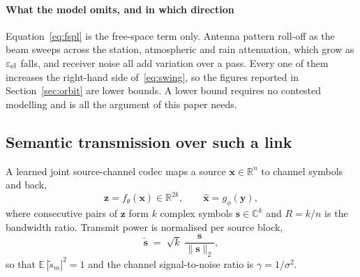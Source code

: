 \documentclass[preprint,11pt,3p]{elsarticle}
\begin{document}
\paragraph{What the model omits, and in which direction}
Equation~\eqref{eq:fspl} is the free-space term only. Antenna pattern roll-off as the beam sweeps
across the station, atmospheric and rain attenuation, which grow as $\varepsilon_{\rm el}$ falls,
and receiver noise all add variation over a pass. Every one of them increases the right-hand side
of~\eqref{eq:swing}, so the figures reported in Section~\ref{sec:orbit} are lower bounds. A lower
bound requires no contested modelling and is all the argument of this paper needs.

\subsection{Semantic transmission over such a link}

A learned joint source-channel codec maps a source $\mathbf{x} \in \mathbb{R}^{n}$ to channel
symbols and back,
\begin{equation}
  \mathbf{z} = f_{\theta}(\mathbf{x}) \in \mathbb{R}^{2k},
  \qquad
  \hat{\mathbf{x}} = g_{\phi}(\mathbf{y}) ,
  \label{eq:codec}
\end{equation}
where consecutive pairs of $\mathbf{z}$ form $k$ complex symbols $\mathbf{s} \in \mathbb{C}^{k}$
and $R = k/n$ is the bandwidth ratio. Transmit power is normalised per source block,
\begin{equation}
  \tilde{\mathbf{s}} \;=\; \sqrt{k}\; \frac{\mathbf{s}}{\lVert \mathbf{s} \rVert_2} ,
  \label{eq:power}
\end{equation}
so that $\mathbb{E}\,|\tilde s_m|^{2} = 1$ and the channel signal-to-noise ratio is
$\gamma = 1/\sigma^{2}$.
\end{document}

